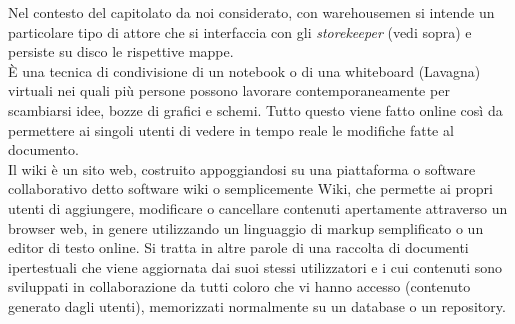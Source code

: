 \documentclass{scalatekids-article}
\begin{document}

   Nel contesto del capitolato da noi considerato, con warehousemen si intende un particolare tipo di attore che si interfaccia con gli \textit{storekeeper} (vedi sopra) e persiste su disco le rispettive mappe.
  \\

   È una tecnica di condivisione di un notebook o di una whiteboard (Lavagna) virtuali nei quali più persone possono lavorare contemporaneamente per scambiarsi idee, bozze di grafici e schemi.
  Tutto questo viene fatto online così da permettere ai singoli utenti di vedere in tempo reale le modifiche fatte al documento.
  \\

   Il wiki è un sito web, costruito appoggiandosi su una piattaforma o software collaborativo detto software wiki o semplicemente Wiki, che permette ai propri utenti di aggiungere, modificare o cancellare contenuti apertamente attraverso un browser web, in genere utilizzando un linguaggio di markup semplificato o un editor di testo online.
  Si tratta in altre parole di una raccolta di documenti ipertestuali che viene aggiornata dai suoi stessi utilizzatori e i cui contenuti sono sviluppati in collaborazione da tutti coloro che vi hanno accesso (contenuto generato dagli utenti), memorizzati normalmente su un database o un repository.
  \\



\end{document}
